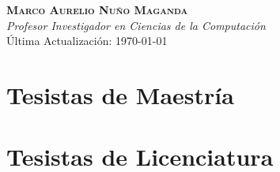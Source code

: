 \documentclass[letterpaper,10pt]{article}
\newcounter{num}
\begin{document}
\begin{center}
    \textbf{\Large \scshape Marco Aurelio Nuño Maganda} \\ \vspace{1pt}
    \textit{Profesor Investigador en Ciencias de la Computación} \\
    Última Actualización: \today \\
\end{center}



\section{Tesistas de Maestría}
\begin{refsection}[TesisDirigidasMaestria]
\nocite{*}
\printbibliography[heading={none}, keyword=one, resetnumbers=true]
\end{refsection}

\section{Tesistas de Licenciatura}
\begin{refsection}[TesisDirigidasLicenciatura]
\nocite{*}
\printbibliography[heading={none}, keyword=two, resetnumbers=true]
\end{refsection}
\end{document}
